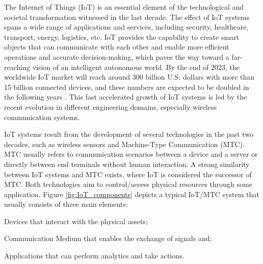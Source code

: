 \documentclass[]{IEEEtran}
\begin{document}








The Internet of Things (IoT) is an essential element of the technological and societal transformation witnessed in the last decade. The effect of IoT systems spans a wide range of applications and services, including security, healthcare, transport, energy, logistics, etc. IoT provides the capability to create smart objects that can communicate with each other and enable more efficient operations and accurate decision-making, which paves the way toward a far-reaching vision of an intelligent autonomous world. By the end of 2023, the worldwide IoT market will reach around 300 billion U.S. dollars with more than 15 billion connected devices, and these numbers are expected to be doubled in the following years \cite{transforma_insights_current_nodate}. This fast accelerated growth of IoT systems is led by the recent evolution in different engineering domains, especially wireless communication systems.

IoT systems result from the development of several technologies in the past two decades, such as wireless sensors and Machine-Type Communication (MTC). MTC usually refers to communication scenarios between a device and a server or directly between end terminals without human interaction. A strong similarity between IoT systems and MTC exists, where IoT is considered the successor of MTC. Both technologies aim to control/access physical resources through some application. Figure \ref{fig:IoT_components} \cite{herrero_fundamentals_2021} depicts a typical IoT/MTC system that usually consists of three main elements: \begin{enumerate*}
    \item Devices that interact with the physical assets;
    \item Communication Medium that enables the exchange of signals and;
    \item Applications that can perform analytics and take actions.
\end{enumerate*}
\end{document}
